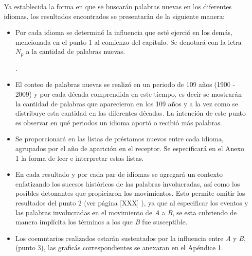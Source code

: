  

Ya establecida la forma en que se buscarán  palabras nuevas en los diferentes idiomas,  los resultados encontrados se presentarán de la siguiente manera:

\begin{itemize}
	
\item Por cada idioma se determinó la influencia que esté ejerció en los demás, mencionada en el punto 1 al comienzo del capítulo. Se denotará con la letra $N_{p}$  a la cantidad de palabras nuevas.

. 


\item El conteo de palabras nuevas se realizó en un periodo de 109 años (1900 - 2009) y por cada década comprendida en este tiempo, es decir  se mostrarán la cantidad de palabras que aparecieron en los 109 años y a la vez como se distribuye esta cantidad en las diferentes décadas.  La intención de este punto es observar en qué periodos un idioma aportó o recibió más palabras. 

\item Se proporcionará en \cite{prestamos_nuevos} las listas  de préstamos nuevos entre cada idioma, agrupados por el año de aparición en el receptor.  Se especificará en el Anexo 1  la forma de leer e interpretar estas listas.

\item En cada resultado y por cada par de idiomas se agregará un contexto enfatizando los sucesos históricos de las palabras involucradas, así como los posibles detonantes que propiciaron los movimientos.  Esto permite omitir los resultados del punto 2 (ver  página [XXX] ), ya que al especificar los eventos y las palabras involucradas en el movimiento de  \textit{A} a \textit{B}, se esta cubriendo de manera implícita los términos  a los que \textit{B} fue susceptible.

\item Los coemntarios realizados estarán sustentados por la influencia entre \textit{A} y \textit{B}, (punto 3), las graficás correspondientes se anexaran en el Apéndice 1.  

\end{itemize}



